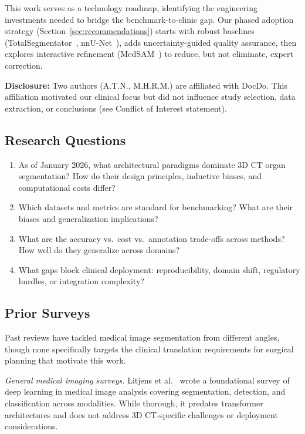 \documentclass[conference]{IEEEtran}
\begin{document}
This work serves as a technology roadmap, identifying the engineering investments needed to bridge the benchmark-to-clinic gap. Our phased adoption strategy (Section~\ref{sec:recommendations}) starts with robust baselines (TotalSegmentator~\cite{wasserthal2023totalsegmentator}, nnU-Net~\cite{isensee2021nnunet}), adds uncertainty-guided quality assurance, then explores interactive refinement (MedSAM~\cite{ma2024medsam}) to reduce, but not eliminate, expert correction.

\textbf{Disclosure:} Two authors (A.T.N., M.H.R.M.) are affiliated with DocDo. This affiliation motivated our clinical focus but did not influence study selection, data extraction, or conclusions (see Conflict of Interest statement).

\subsection{Research Questions}

\begin{enumerate}
    \item[\textbf{RQ1}:] As of January 2026, what architectural paradigms dominate 3D CT organ segmentation? How do their design principles, inductive biases, and computational costs differ?
    
    \item[\textbf{RQ2}:] Which datasets and metrics are standard for benchmarking? What are their biases and generalization implications?
    
    \item[\textbf{RQ3}:] What are the accuracy vs.\ cost vs.\ annotation trade-offs across methods? How well do they generalize across domains?
    
    \item[\textbf{RQ4}:] What gaps block clinical deployment: reproducibility, domain shift, regulatory hurdles, or integration complexity?
\end{enumerate}

\subsection{Prior Surveys}

Past reviews have tackled medical image segmentation from different angles, though none specifically targets the clinical translation requirements for surgical planning that motivate this work.

\emph{General medical imaging surveys.} Litjens et al.\ \cite{litjens2017survey} wrote a foundational survey of deep learning in medical image analysis covering segmentation, detection, and classification across modalities. While thorough, it predates transformer architectures and does not address 3D CT-specific challenges or deployment considerations.
\end{document}
